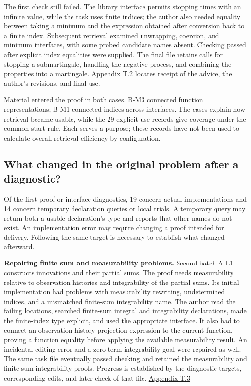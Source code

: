 The first check still failed. The library interface permits stopping times with an infinite value, while the task uses finite indices; the author also needed equality between taking a minimum and the expression obtained after conversion back to a finite index. Subsequent retrieval examined unwrapping, coercion, and minimum interfaces, with some probed candidate names absent. Checking passed after explicit index equalities were supplied. The final file retains calls for stopping a submartingale, handling the negative process, and combining the properties into a martingale. \href{en-appendix.pdf\#t2}{Appendix T.2} locates receipt of the advice, the author's revisions, and final use.

Material entered the proof in both cases. B-M3 connected function representations; B-M1 connected indices across interfaces. The cases explain how retrieval became usable, while the 29 explicit-use records give coverage under the common start rule. Each serves a purpose; these records have not been used to calculate overall retrieval efficiency by configuration.

\subsection[What changed in the original problem after a diagnostic?]{\texorpdfstring{\protect\hypertarget{section-5-3}{}What changed in the original problem after a diagnostic?}{What changed in the original problem after a diagnostic?}}
Of the first proof or interface diagnostics, 19 concern actual implementations and 14 concern temporary declaration queries or local trials. A temporary query may return both a usable declaration's type and reports that other names do not exist. An implementation error may require changing a proof intended for delivery. Following the same target is necessary to establish what changed afterward.

\textbf{Repairing finite-sum and measurability problems.} Second-batch A-L1 constructs innovations and their partial sums. The proof needs measurability relative to observation histories and integrability of the partial sums. Its initial implementation had problems with measurability rewriting, undetermined indices, and a mismatched finite-sum integrability name. The author read the failing locations, searched finite-sum integral and integrability declarations, made the finite-index type explicit, and used the appropriate interface. It also had to connect an observation-history projection expression to the current function, proving a function equality before applying the available measurability result. An incidental editing error and a zero-term integrability goal were repaired as well. The same task file eventually passed checking and retained the measurability and finite-sum integrability proofs. Progress is established by the diagnostic targets, corresponding edits, and later check of that file. \href{en-appendix.pdf\#t3}{Appendix T.3}

